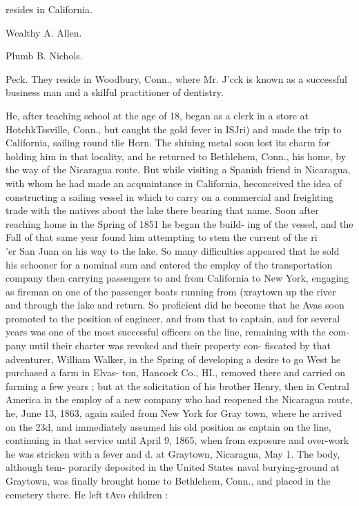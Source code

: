 \documentclass{book}
\begin{document}
resides in California. 


Wealthy A. Allen. 




Plumb B. Nichols. 


Peck. They reside in Woodbury, Conn., where Mr. J'cck is 
known as a successful business man and a skilful practitioner 
of dentistry. 





He, after teaching school at the age of 18, began as a clerk in 
a store at HotchkTssville, Conn., but caught the gold fever in 
ISJri) and made the trip to California, sailing round tlie Horn. 
The shining metal soon lost its charm for holding him in that 
locality, and he returned to Bethlehem, Conn., his home, by 
the way of the Nicaragua route. But while visiting a Spanish 
friend in Nicaragua, with whom he had made an acquaintance 
in California, heconceived the idea of constructing a sailing 
vessel in which to carry on a commercial and freighting trade 
with the natives about the lake there bearing that name. Soon 
after reaching home in the Spring of 1851 he began the build- 
ing of the vessel, and the Fall of that same year found him 
attempting to stem the current of the ri\\'er San Juan on his 
way to the lake. So many difficulties appeared that he sold 
his schooner for a nominal sum and entered the employ of the 
transportation company then carrying passengers to and from 
California to New York, engaging as fireman on one of the 
passenger boats running from (xraytown up the river and 
through the lake and return. So proficient did he become 
that he Avas soon promoted to the position of engineer, and 
from that to captain, and for several years was one of the 
most successful officers on the line, remaining with the com- 
pany until their charter was revoked and their property con- 
fiscated by that adventurer, William Walker, in the Spring of 
developing a desire to go West he purchased a farm in Elvas- 
ton, Hancock Co., HI., removed there and carried on farming 
a few years ; but at the solicitation of his brother Henry, then 
in Central America in the employ of a new company who had 
reopened the Nicaragua route, he, June 13, 1863, again sailed 
from New York for Gray town, where he arrived on the 23d, 
and immediately assumed his old position as captain on the 
line, continuing in that service until April 9, 1865, when from 
exposure and over-work he was stricken with a fever and d. 
at Graytown, Nicaragua, May 1. The body, although tem- 
porarily deposited in the United States naval burying-ground 
at Graytown, was finally brought home to Bethlehem, Conn., 
and placed in the cemetery there. He left tAvo children : 
\end{document}
